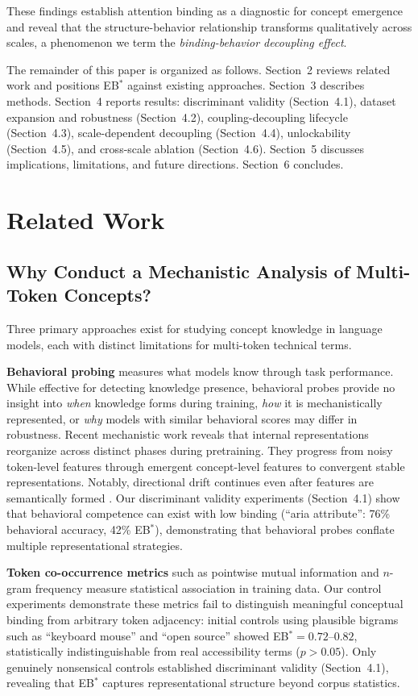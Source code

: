 \documentclass[10pt]{article} %
\begin{document}
These findings establish attention binding as a diagnostic for concept emergence and reveal that the structure-behavior relationship transforms qualitatively across scales, a phenomenon we term the \emph{binding-behavior decoupling effect}.

The remainder of this paper is organized as follows.
Section~2 reviews related work and positions EB$^*$ against existing approaches.
Section~3 describes methods.
Section~4 reports results: discriminant validity (Section~4.1), dataset expansion and robustness (Section~4.2), coupling-decoupling lifecycle (Section~4.3), scale-dependent decoupling (Section~4.4), unlockability (Section~4.5), and cross-scale ablation (Section~4.6).
Section~5 discusses implications, limitations, and future directions.
Section~6 concludes.

\section{Related Work}

\subsection{Why Conduct a Mechanistic Analysis of Multi-Token Concepts?}

Three primary approaches exist for studying concept knowledge in language models, each with distinct limitations for multi-token technical terms.

\textbf{Behavioral probing} \citep{meng2022locating,olsson2022context} measures what models know through task performance.
While effective for detecting knowledge presence, behavioral probes provide no insight into \emph{when} knowledge forms during training, \emph{how} it is mechanistically represented, or \emph{why} models with similar behavioral scores may differ in robustness.
Recent mechanistic work reveals that internal representations reorganize across distinct phases during pretraining. They progress from noisy token-level features through emergent concept-level features to convergent stable representations. Notably, directional drift continues even after features are semantically formed \citep{xu2025tracking}.
Our discriminant validity experiments (Section~4.1) show that behavioral competence can exist with low binding (``aria attribute'': 76\% behavioral accuracy, 42\% EB$^*$), demonstrating that behavioral probes conflate multiple representational strategies.

\textbf{Token co-occurrence metrics} such as pointwise mutual information and $n$-gram frequency measure statistical association in training data.
Our control experiments demonstrate these metrics fail to distinguish meaningful conceptual binding from arbitrary token adjacency: initial controls using plausible bigrams such as ``keyboard mouse'' and ``open source'' showed EB$^*=0.72$--$0.82$, statistically indistinguishable from real accessibility terms ($p>0.05$).
Only genuinely nonsensical controls established discriminant validity (Section~4.1), revealing that EB$^*$ captures representational structure beyond corpus statistics.
\end{document}
